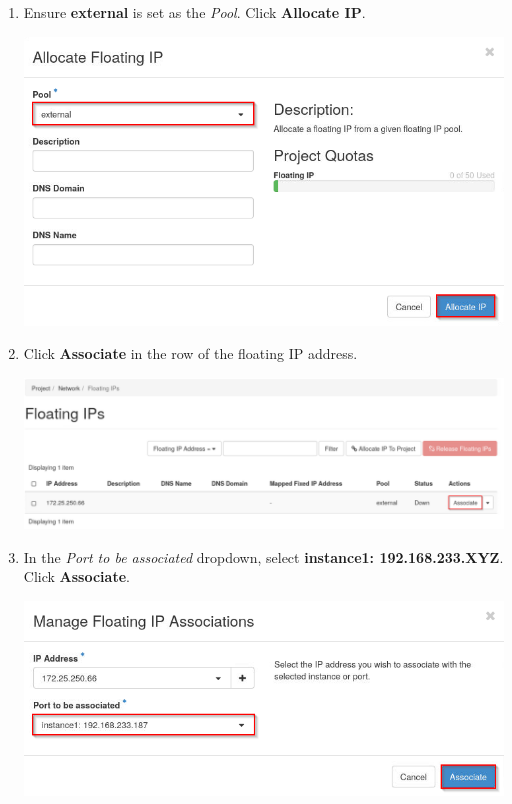\documentclass[letterpaper, 12pt]{article}
\begin{document}
\begin{enumerate}
    \item Ensure \textbf{external} is set as the \textit{Pool}. Click \textbf{Allocate IP}.
    
    \begin{center}
        \includegraphics[width=\linewidth]{images/part3/step5.png}
    \end{center}

    \item Click \textbf{Associate} in the row of the floating IP address.

    \begin{center}
        \includegraphics[width=\linewidth]{images/part3/step6.png}
    \end{center}
    
    \item In the \textit{Port to be associated} dropdown, select \textbf{instance1: 192.168.233.XYZ}. Click
    \textbf{Associate}.

    \begin{center}
        \includegraphics[width=\linewidth]{images/part3/step7.png}
    \end{center}


\end{enumerate}
\end{document}
